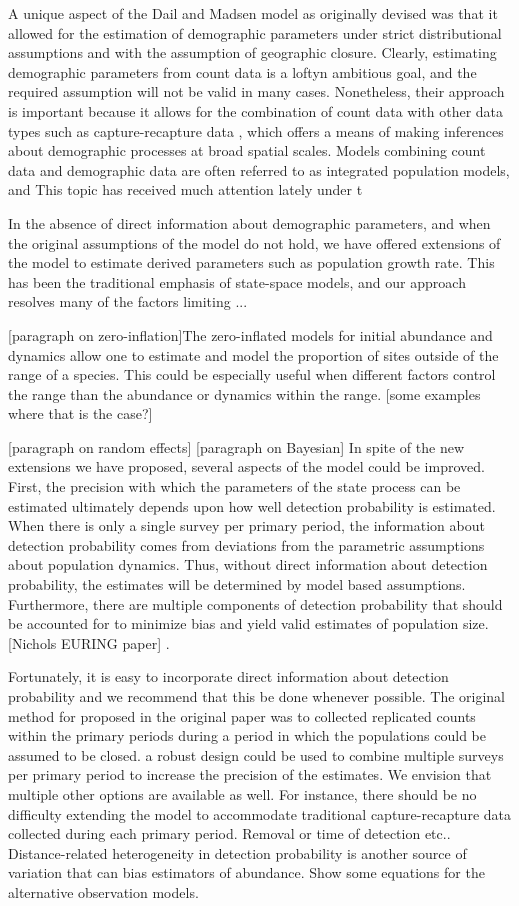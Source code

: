 \documentclass[12pt]{article}
\begin{document}
A unique aspect of the Dail and Madsen model as originally devised was
that it allowed for the estimation of demographic parameters under
strict distributional assumptions and with the assumption of
geographic closure. Clearly, estimating demographic parameters from
count data is a loftyn ambitious goal, and the required assumption
will not be valid in many cases. Nonetheless, their approach is
important because it allows for the combination of count data with
other data types such as capture-recapture data , which offers a
means of making inferences about demographic processes at broad
spatial scales. Models combining count data and demographic data are
often referred to as integrated population models, and This topic has
received much attention lately under t

In the absence of direct information about demographic parameters, and
when the original assumptions of the model do not hold, we have
offered extensions of the model to estimate derived parameters such as
population growth rate. This has been the traditional emphasis of
state-space models, and our approach resolves many of the factors
limiting ...

[paragraph on zero-inflation]The zero-inflated models for initial
abundance and dynamics allow one to estimate and model the proportion
of sites outside of the range of a species.  This could be especially
useful when different factors control the range than the abundance or
dynamics within the range.  [some examples where that is the case?]

[paragraph on random effects]
[paragraph on Bayesian]
In spite of the new extensions we have proposed, several aspects of
the model could be improved. First, the precision with which the
parameters of the state process can be estimated ultimately depends
upon how well detection probability is estimated. When there is only a
single survey per primary period, the information about detection
probability comes from deviations from the parametric assumptions
about population dynamics. Thus, without direct information about
detection probability, the estimates will be determined by model based
assumptions. Furthermore, there are multiple components of detection
probability that should be accounted for to minimize bias and yield
valid estimates of population size. [Nichols EURING paper] .

Fortunately, it is easy to incorporate direct information about
detection probability and we recommend that this be done whenever
possible. The original method for proposed in the original paper was
to collected replicated counts within the primary periods during a
period in which the populations could be assumed to be closed.  a
robust design could be used to combine multiple surveys per primary
period to increase the precision of the estimates. We envision that
multiple other options are available as well. For instance, there
should be no difficulty extending the model to accommodate traditional
capture-recapture data collected during each primary period. Removal
or time of detection etc.. Distance-related heterogeneity in detection
probability is another source of variation that can bias estimators of
abundance.   Show some equations for the alternative observation
models.
\end{document}
